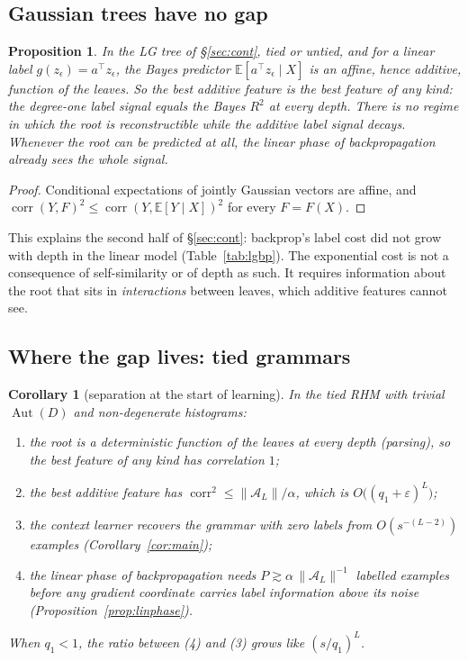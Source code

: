 \documentclass[11pt]{article}
\newtheorem{proposition}[theorem]{Proposition}
\newtheorem{corollary}[theorem]{Corollary}
\theoremstyle{definition}
\newcommand{\E}{\mathbb{E}}
\newcommand{\norm}[1]{\lVert #1\rVert}
\begin{document}
\subsection{Gaussian trees have no gap}
\begin{proposition}\label{prop:gaussnogap}
In the LG tree of \S\ref{sec:cont}, tied or untied, and for a linear label $g(z_\epsilon)=a^{\!\top}z_\epsilon$,
the Bayes predictor $\E[a^{\!\top}z_\epsilon\mid X]$ is an affine, hence additive, function of the
leaves. So the best additive feature is the best feature of any kind: the degree-one label signal
equals the Bayes $R^2$ at every depth. There is no regime in which the root is reconstructible while
the additive label signal decays. Whenever the root can be predicted at all, the linear phase of
backpropagation already sees the whole signal.
\end{proposition}
\begin{proof}
Conditional expectations of jointly Gaussian vectors are affine, and $\operatorname{corr}(Y,F)^2\le
\operatorname{corr}(Y,\E[Y\mid X])^2$ for every $F=F(X)$.
\end{proof}
\noindent This explains the second half of \S\ref{sec:cont}: backprop's label cost did not grow with
depth in the linear model (Table~\ref{tab:lgbp}). The exponential cost is not a consequence of
self-similarity or of depth as such. It requires information about the root that sits in
\emph{interactions} between leaves, which additive features cannot see.

\subsection{Where the gap lives: tied grammars}
\begin{corollary}[separation at the start of learning]\label{cor:separation}
In the tied RHM with trivial $\operatorname{Aut}(D)$ and non-degenerate histograms:
\begin{enumerate}
\item the root is a deterministic function of the leaves at every depth (parsing), so the best
feature of any kind has correlation $1$;
\item the best additive feature has $\operatorname{corr}^2\le\norm{\mathcal A_L}/\alpha$, which is
$O\big((q_1+\varepsilon)^L\big)$;
\item the context learner recovers the grammar with zero labels from
$O(s^{-(L-2)})$ examples (Corollary~\ref{cor:main});
\item the linear phase of backpropagation needs $P\gtrsim\alpha\,\norm{\mathcal A_L}^{-1}$ labelled examples
before any gradient coordinate carries label information above its noise
(Proposition~\ref{prop:linphase}).
\end{enumerate}
When $q_1<1$, the ratio between (4) and (3) grows like $(s/q_1)^{L}$.
\end{corollary}
\end{document}
